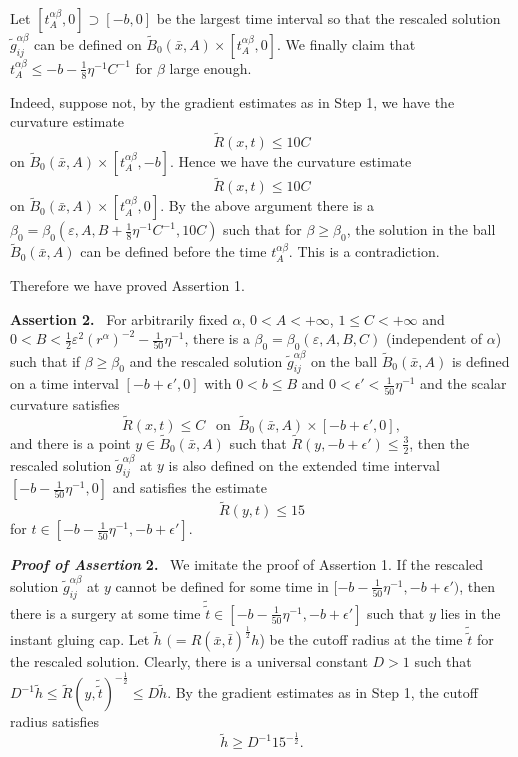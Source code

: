 Let $[t_{A}^{\alpha\beta},0]\supset[-b,0]$ be the largest time
interval so that the rescaled solution
$\widetilde{g}^{\alpha\beta}_{ij}$ can be defined on
$\widetilde{B}_{0}(\bar{x},A)\times[t_{A}^{\alpha\beta},0]$. We
finally claim that $t_{A}^{\alpha\beta}\le
-b-\frac{1}{8}\eta^{-1}C^{-1}$ for $\beta$ large enough.

Indeed, suppose not, by the gradient estimates as in Step 1, we
have the curvature estimate
$$
\widetilde{R}(x,t)\leq {10C}
$$
on $\widetilde{B}_{0}(\bar{x},A)\times [t_{A}^{\alpha\beta},-b]$.
Hence we have the curvature estimate
$$
\widetilde{R}(x,t)\leq {10C}
$$
on $\widetilde{B}_{0}(\bar{x},A)\times [t_{A}^{\alpha\beta},0]$.
By the above argument there is a $\beta_0=\beta_0( \varepsilon, A,
B + \frac{1}{8}\eta^{-1}C^{-1}, 10C)$ such that for
$\beta\geq\beta_0$, the solution in the ball
$\widetilde{B}_{0}(\bar{x},A)$ can be defined before the time
$t_{A}^{\alpha\beta}$. This is a contradiction.

Therefore we have proved Assertion 1.

\medskip
{\bf Assertion 2.} \ For arbitrarily fixed $\alpha$,
$0<A<+\infty$, $1 \leq C<+\infty$ and $0 < B
<\frac{1}{2}\varepsilon^2 (r^{\alpha})^{-2}-
\frac{1}{50}\eta^{-1}$, there is a $\beta_0=\beta_0(\varepsilon,
A,B,C)$ (independent of $\alpha$) such that if $\beta\geq\beta_0$
and the rescaled solution $\widetilde{g}^{\alpha\beta}_{ij}$ on
the ball $\widetilde{B}_{0}(\bar{x},A)$ is defined on a time
interval $[-b+\epsilon',0]$ with $0 < b \leq B$ and $0<\epsilon'
<\frac{1}{50}\eta^{-1}$ and the scalar curvature satisfies
$$
\widetilde{R}(x,t)\leq {C} \ \ \mbox{ on } \
\widetilde{B}_{0}(\bar{x},A)\times [-b+\epsilon',0],
$$
 and there is a point $y\in \widetilde{B}_{0}(\bar{x},A)$ such
that $\widetilde{R}(y,-b+\epsilon')\leq \frac{3}{2}$, then the
rescaled solution $\widetilde{g}^{\alpha\beta}_{ij}$ at $y$ is
also defined on the extended time interval
$[-b-\frac{1}{50}\eta^{-1},0]$ and satisfies the estimate
$$
\widetilde{R}(y,t)\leq 15
$$
for $t\in[-b-\frac{1}{50}\eta^{-1},-b+\epsilon']$.

\medskip
{\bf \em Proof of Assertion} {\bf 2.} \ We imitate the proof of
Assertion 1. If the rescaled solution
$\widetilde{g}^{\alpha\beta}_{ij}$ at $y$ cannot be defined for
some time in $[-b-\frac{1}{50}\eta^{-1},-b+\epsilon')$, then there
is a surgery at some time $\tilde{\tilde{t}} \in
[-b-\frac{1}{50}\eta^{-1},-b+\epsilon']$ such that $y$ lies in the
instant gluing cap.  Let $\tilde{h}$
$(=R(\bar{x},\bar{t})^{\frac{1}{2}}h$) be the cutoff radius at the
time $\tilde{\tilde{t}}$ for the rescaled solution. Clearly, there
is a universal constant $D>1$ such that
${D}^{-1}\tilde{h}\leq\widetilde{R}(y,\tilde{\tilde{t}})^{-\frac{1}{2}}
\leq D\tilde{h}$. By the gradient estimates as in Step 1, the
cutoff radius satisfies
$$
\tilde{h} \geq D^{-1}15^{-\frac{1}{2}}.
$$

